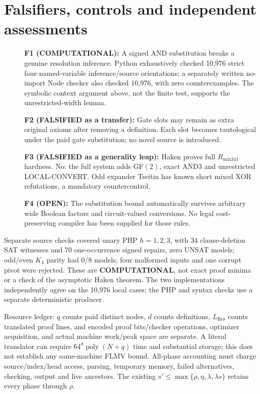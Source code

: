 \documentclass[11pt]{article}
\begin{document}
\section*{Falsifiers, controls and independent assessments}
\begin{description}
\item[] \textbf{F1 (COMPUTATIONAL):} A signed AND substitution breaks a genuine resolution inference. Python exhaustively checked 10,976 strict four-named-variable inference/source orientations; a separately written no-import Node checker also checked 10,976, with zero counterexamples. The symbolic context argument above, not the finite test, supports the unrestricted-width lemma.
\item[] \textbf{F2 (FALSIFIED as a transfer):} Gate slots may remain as extra original axioms after removing a definition. Each slot becomes tautological under the paid gate substitution; no novel source is introduced.
\item[] \textbf{F3 (FALSIFIED as a generality leap):} Haken proves full $R_{\mathrm{mix341}}$ hardness. No: the full system adds GF$(2)$, exact AND3 and unrestricted LOCAL-CONVERT. Odd expander Tseitin has known short mixed XOR refutations, a mandatory countercontrol.
\item[] \textbf{F4 (OPEN):} The substitution bound automatically survives arbitrary wide Boolean factors and circuit-valued conversions. No legal cost-preserving compiler has been supplied for those rules.
\end{description}
Separate source checks covered unary PHP $h=1,2,3$, with 34 clause-deletion SAT witnesses and 70 one-occurrence signed repairs, zero UNSAT models; odd/even $K_4$ parity had 0/8 models; four malformed inputs and one corrupt pivot were rejected. These are \textbf{COMPUTATIONAL}, not exact proof minima or a check of the asymptotic Haken theorem. The two implementations independently agree on the 10,976 local cases; the PHP and syntax checks use a separate deterministic producer.

Resource ledger: $q$ counts paid distinct nodes, $d$ counts definitions, $L_{\mathrm{Res}}$ counts translated proof lines, and encoded proof bits/checker operations, optimizer acquisition, and actual machine work/peak space are separate. A literal translator can require $64^d\operatorname{poly}(N+q)$ time and substantial storage; this does not establish any same-machine FLMV bound. All-phase accounting must charge source/index/head access, parsing, temporary memory, failed alternatives, checking, output and live ancestors. The existing $s'\le\max\{\rho,\eta,\lambda,\lambda s\}$ retains every phase through $\rho$.
\end{document}
